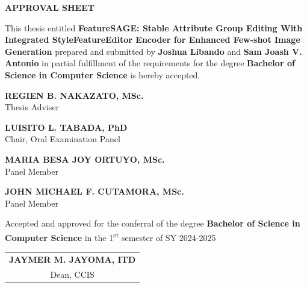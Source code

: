 \begin{singlespace}
\thispagestyle{fancy}
\vspace*{-1.5cm}
\begin{center}
\textbf{\fontsize{14}{16}\selectfont APPROVAL SHEET}
\end{center}

\begin{justify}
\hspace{\parindent}This thesis entitled \textbf{FeatureSAGE: Stable Attribute Group Editing With Integrated StyleFeatureEditor Encoder for Enhanced Few-shot Image Generation}
prepared and submitted by \textbf{Joshua Libando} and \textbf{Sam Joash V. Antonio}
in partial fulfillment of the requirements for the degree \textbf{Bachelor of Science in Computer Science} is hereby accepted.
\end{justify}

\vspace{1cm}

\begin{center}
\textbf{REGIEN B. NAKAZATO, MSc.} \\
Thesis Adviser
\end{center}

\vspace{1cm}

\begin{center}
\textbf{LUISITO L. TABADA, PhD} \\
Chair, Oral Examination Panel
\end{center}

\vspace{2cm}

\begin{minipage}[t]{0.45\textwidth}
\begin{center}
\textbf{MARIA BESA JOY ORTUYO, MSc.} \\
Panel Member
\end{center}
\end{minipage}%
\hfill
\begin{minipage}[t]{0.45\textwidth}
\begin{center}
\textbf{JOHN MICHAEL F. CUTAMORA, MSc.} \\
Panel Member
\end{center}
\end{minipage}

\vspace{2cm}

\begin{justify}
\hspace{\parindent}Accepted and approved for the conferral of the degree \textbf{Bachelor of Science in Computer Science}
in the 1\textsuperscript{st} semester of SY 2024-2025
\end{justify}

\vspace{2cm}

\begin{flushright}
\begin{tabular}{c}
\textbf{JAYMER M. JAYOMA, ITD} \\
Dean, CCIS
\end{tabular}
\end{flushright}
\end{singlespace}
